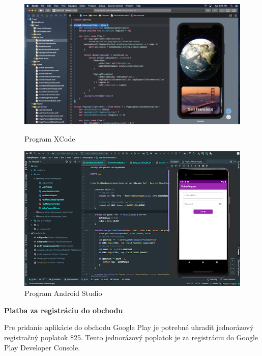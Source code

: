 \documentclass[10pt,twoside,slovak,a4paper]{article}
\begin{document}
\begin{figure}[h!]
	\centering
	\begin{minipage}[b]{1\textwidth}
		\includegraphics[width=\textwidth]{XCode}
		\caption{Program XCode \cite{appleinsider}}
	\end{minipage}
	\hfill
	\begin{minipage}[b]{1\textwidth}
		\includegraphics[width=\textwidth]{Android_Studio}
		\caption{Program Android Studio \cite{gStrikar}}
	\end{minipage}
\end{figure}

\newpage           %




\textbf{Platba za registráciu do obchodu}

Pre pridanie aplikácie do obchodu Google Play je potrebné uhradiť jednorázový registračný poplatok \$25. Tento jednorázový poplatok je za registráciu do Google Play Developer Console.
\cite{RedBytes}
\end{document}
